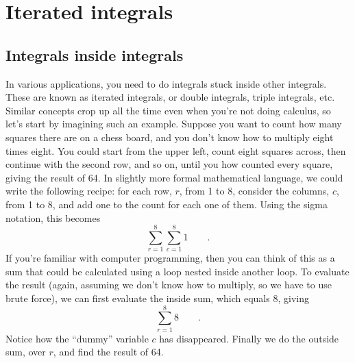 \chapter{Iterated integrals}\label{ch:iterated-int}

\section{Integrals inside integrals}

In various applications, you need to do
integrals stuck inside other integrals. These are known as
iterated integrals, or double integrals, triple integrals, etc. Similar concepts
crop up all the time even when you're not doing calculus, so let's start by
imagining such an example. Suppose you want to count how many squares there are
on a chess board, and you don't know how to multiply eight times eight. You
could start from the upper left, count eight squares across, then continue with
the second row, and so on, until you how counted every square, giving the result
of 64. In slightly more formal mathematical language, we could write the following
recipe: for each row, $r$, from 1 to 8, consider the columns, $c$, from 1 to 8,
and add one to the count for each one of them. Using the sigma notation, this
becomes
\begin{equation*}
  \sum_{r=1}^8 \sum_{c=1}^8 1 \qquad .
\end{equation*}
If you're familiar with computer programming, then you can think of this as
a sum that could be calculated using a loop nested inside another loop.
To evaluate the result (again, assuming we don't know how to multiply, so we
have to use brute force), we can first evaluate the inside sum, which equals
8, giving
\begin{equation*}
  \sum_{r=1}^8 8 \qquad .
\end{equation*}
Notice how the ``dummy'' variable $c$ has disappeared. Finally we do the outside
sum, over $r$, and find the result of 64.


